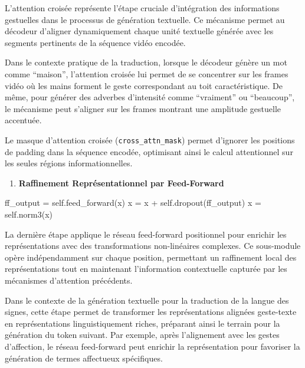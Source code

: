 \documentclass[12pt]{article}
\providecommand{\tightlist}{%
      \setlength{\itemsep}{0pt}\setlength{\parskip}{0pt}}
\newenvironment{Shaded}{}{}
\newcommand{\NormalTok}[1]{{#1}}
\newcommand{\VariableTok}[1]{\textcolor[rgb]{0.10,0.09,0.49}{{#1}}}
\newcommand{\OperatorTok}[1]{\textcolor[rgb]{0.40,0.40,0.40}{{#1}}}
\begin{document}
L'attention croisée représente l'étape cruciale d'intégration des
informations gestuelles dans le processus de génération textuelle. Ce
mécanisme permet au décodeur d'aligner dynamiquement chaque unité
textuelle générée avec les segments pertinents de la séquence vidéo
encodée.

Dans le contexte pratique de la traduction, lorsque le décodeur génère
un mot comme ``maison'', l'attention croisée lui permet de se concentrer
sur les frames vidéo où les mains forment le geste correspondant au toit
caractéristique. De même, pour générer des adverbes d'intensité comme
``vraiment'' ou ``beaucoup'', le mécanisme peut s'aligner sur les frames
montrant une amplitude gestuelle accentuée.

Le masque d'attention croisée (\texttt{cross\_attn\_mask}) permet
d'ignorer les positions de padding dans la séquence encodée, optimisant
ainsi le calcul attentionnel sur les seules régions informationnelles.

\begin{enumerate}
\def\labelenumi{\arabic{enumi}.}
\setcounter{enumi}{5}
\tightlist
\item
  \textbf{Raffinement Représentationnel par Feed-Forward}
\end{enumerate}

\begin{Shaded}
\begin{Highlighting}[]
\NormalTok{ff\_output }\OperatorTok{=} \VariableTok{self}\NormalTok{.feed\_forward(x)}
\NormalTok{x }\OperatorTok{=}\NormalTok{ x }\OperatorTok{+} \VariableTok{self}\NormalTok{.dropout(ff\_output)}
\NormalTok{x }\OperatorTok{=} \VariableTok{self}\NormalTok{.norm3(x)}
\end{Highlighting}
\end{Shaded}

La dernière étape applique le réseau feed-forward positionnel pour
enrichir les représentations avec des transformations non-linéaires
complexes. Ce sous-module opère indépendamment sur chaque position,
permettant un raffinement local des représentations tout en maintenant
l'information contextuelle capturée par les mécanismes d'attention
précédents.

Dans le contexte de la génération textuelle pour la traduction de la
langue des signes, cette étape permet de transformer les représentations
alignées geste-texte en représentations linguistiquement riches,
préparant ainsi le terrain pour la génération du token suivant. Par
exemple, après l'alignement avec les gestes d'affection, le réseau
feed-forward peut enrichir la représentation pour favoriser la
génération de termes affectueux spécifiques.
\end{document}

